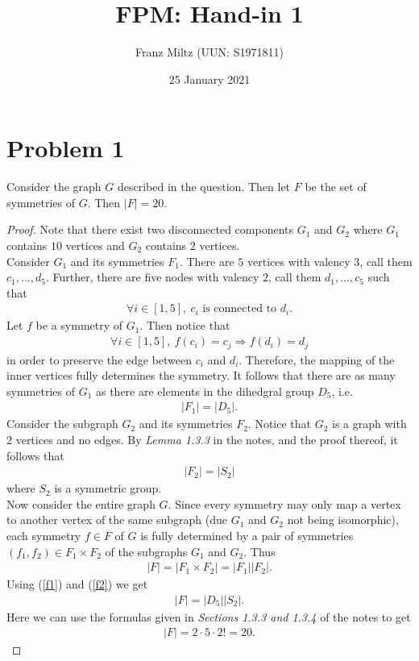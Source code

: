 \documentclass{article}
\begin{document}
\title{FPM: Hand-in 1}
\author{Franz Miltz (UUN: S1971811)}
\date{25 January 2021}
\maketitle

\section*{Problem 1}
\begin{claim}
   Consider the graph $G$ described in the question. Then
   let $F$ be the set of symmetries of $G$. Then $|F|=20$.
\end{claim}
\begin{proof}
   Note that there exist two disconnected components
   $G_1$ and $G_2$ where $G_1$ contains $10$ vertices
   and $G_2$ contains $2$ vertices. \\
   Consider $G_1$ and its symmetries $F_1$. There are $5$ vertices with valency
   $3$, call them $c_1, ..., d_5$. Further, there are
   five nodes with valency $2$, call them $d_1, ..., c_5$
   such that
   \begin{align*}
      \forall i\in[1,5],\: c_i \text{ is connected to } d_i.
   \end{align*}
   Let $f$ be a symmetry of $G_1$. Then notice that
   \begin{align*}
      \forall i\in[1,5],\: f(c_i)=c_j \Rightarrow f(d_i)=d_j
   \end{align*}
   in order to preserve the edge between $c_i$ and $d_i$.
   Therefore, the mapping of the inner vertices fully
   determines the symmetry. It follows that there are as
   many symmetries of $G_1$ as there are elements in the
   dihedgral group $D_5$, i.e.
   \begin{align}
      \label{f1}
      |F_1|=|D_5|.
   \end{align}
   Consider the subgraph $G_2$ and its symmetries $F_2$.
   Notice that $G_2$ is a graph with $2$ vertices and
   no edges. By \emph{Lemma 1.3.3} in the notes, and the
   proof thereof, it follows that
   \begin{align}
      \label{f2}
      |F_2|=|S_2|
   \end{align}
   where $S_2$ is a symmetric group.\\
   Now consider the entire graph $G$. Since every symmetry may
   only map a vertex to another vertex of the same subgraph
   (due $G_1$ and $G_2$ not being isomorphic),
   each symmetry $f\in F$ of $G$ is fully determined by
   a pair of symmetries $(f_1, f_2)\in F_1\times F_2$ of
   the subgraphs $G_1$ and $G_2$. Thus
   \begin{align*}
      |F| = |F_1\times F_2| = |F_1||F_2|.
   \end{align*}
   Using (\ref{f1}) and (\ref{f2}) we get
   \begin{align*}
      |F| = |D_5||S_2|.
   \end{align*}
   Here we can use the formulas given in \emph{Sections 1.3.3
      and 1.3.4} of the notes to get
   \begin{align*}
      |F| = 2\cdot 5\cdot 2! = 20.
   \end{align*}
\end{proof}
\end{document}
